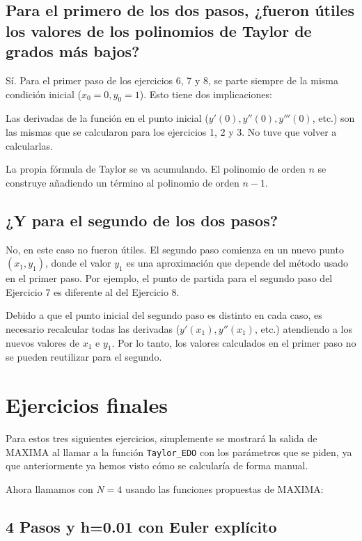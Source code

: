 \documentclass{article}
\begin{document}
\subsection{Para el primero de los dos pasos, ¿fueron útiles los valores de los polinomios de Taylor de grados más bajos? }


Sí. Para el primer paso de los ejercicios 6, 7 y 8, se parte siempre de la misma condición inicial ($x_0=0, y_0=1$). Esto tiene dos implicaciones:

Las derivadas de la función en el punto inicial ($y'(0), y''(0), y'''(0)$, etc.) son las mismas que se calcularon para los ejercicios 1, 2 y 3. No tuve que volver a calcularlas.

La propia fórmula de Taylor se va acumulando. El polinomio de orden $n$ se construye añadiendo un término al polinomio de orden $n-1$.

\subsection{¿Y para el segundo de los dos pasos?}

No, en este caso no fueron útiles. El segundo paso comienza en un nuevo punto $(x_1, y_1)$, donde el valor $y_1$ es una aproximación que depende del método usado en el primer paso. Por ejemplo, el punto de partida para el segundo paso del Ejercicio 7 es diferente al del Ejercicio 8.

Debido a que el punto inicial del segundo paso es distinto en cada caso, es necesario recalcular todas las derivadas ($y'(x_1), y''(x_1)$, etc.) atendiendo a los nuevos valores de $x_1$ e $y_1$. Por lo tanto, los valores calculados en el primer paso no se pueden reutilizar para el segundo.

\section{Ejercicios finales}

Para estos tres siguientes ejercicios, simplemente se mostrará la salida de MAXIMA al llamar a la función \verb|Taylor_EDO| con los parámetros que se piden, ya que anteriormente ya hemos visto cómo se calcularía de forma manual.

Ahora llamamos con $N=4$ usando las funciones propuestas de MAXIMA:

\subsection{4 Pasos y h=0.01 con Euler explícito}
\end{document}
